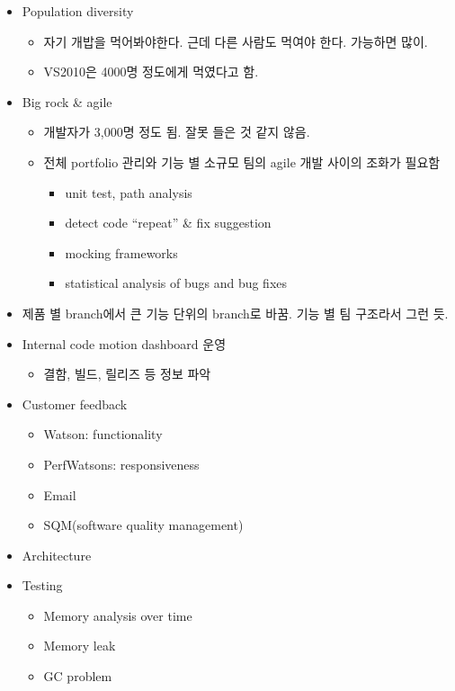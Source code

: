 \documentclass[11pt]{article}
\begin{document}
\begin{itemize}
\item Population diversity
    \begin{itemize}
    \item 자기 개밥을 먹어봐야한다. 근데 다른 사람도 먹여야 한다. 가능하면 많이.
    \item VS2010은 4000명 정도에게 먹였다고 함.
    \end{itemize}
\item Big rock \& agile
    \begin{itemize}
    \item 개발자가 3,000명 정도 됨. 잘못 들은 것 같지 않음.
    \item 전체 portfolio 관리와 기능 별 소규모 팀의 agile 개발 사이의 
    조화가 필요함
        \begin{itemize}
        \item unit test, path analysis
        \item detect code ``repeat'' \& fix suggestion
        \item mocking frameworks
        \item statistical analysis of bugs and bug fixes
        \end{itemize}
    \end{itemize}
\item 제품 별 branch에서 큰 기능 단위의 branch로 바꿈. 
기능 별 팀 구조라서 그런 듯.
\item Internal code motion dashboard 운영
    \begin{itemize}
    \item 결함, 빌드, 릴리즈 등 정보 파악
    \end{itemize}
\item Customer feedback
    \begin{itemize}
    \item Watson: functionality
    \item PerfWatsons: responsiveness
    \item Email
    \item SQM(software quality management)
    \end{itemize}
\item Architecture
\item Testing
    \begin{itemize}
    \item Memory analysis over time
    \item Memory leak
    \item GC problem
    \end{itemize}
\end{itemize}
\end{document}

